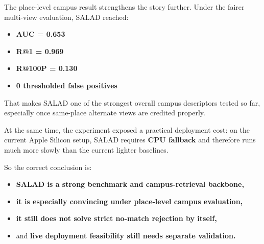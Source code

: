 \documentclass[11pt]{article}
\begin{document}
The place-level campus result strengthens the story further. Under the fairer multi-view evaluation, SALAD reached:
\begin{itemize}[leftmargin=*]
  \item \textbf{AUC = 0.653}
  \item \textbf{R@1 = 0.969}
  \item \textbf{R@100P = 0.130}
  \item \textbf{0 thresholded false positives}
\end{itemize}

That makes SALAD one of the strongest overall campus descriptors tested so far, especially once same-place alternate views are credited properly.

At the same time, the experiment exposed a practical deployment cost: on the current Apple Silicon setup, SALAD requires \textbf{CPU fallback} and therefore runs much more slowly than the current lighter baselines.

So the correct conclusion is:
\begin{itemize}[leftmargin=*]
  \item \textbf{SALAD is a strong benchmark and campus-retrieval backbone,}
  \item \textbf{it is especially convincing under place-level campus evaluation,}
  \item \textbf{it still does not solve strict no-match rejection by itself,}
  \item and \textbf{live deployment feasibility still needs separate validation.}
\end{itemize}
\end{document}
